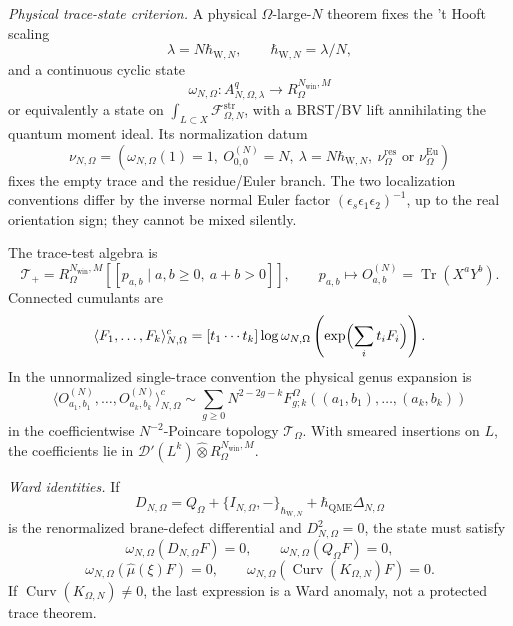 \begin{stmt}
  \emph{Physical trace-state criterion.} A physical
  \(\Omega\)-large-\(N\) theorem fixes the 't Hooft scaling
  \[
    \lambda=N\hbar_{\mathrm{W},N},\qquad
    \hbar_{\mathrm{W},N}=\lambda/N,
  \]
  and a continuous cyclic state
  \[
    \omega_{N,\Omega}\colon
    A^q_{N,\Omega,\lambda}
    \longrightarrow R_{\Omega}^{N_{\mathrm{win}},M}
  \]
  or equivalently a state on
  \(\int_{L\subset X}\mathcal F^{\mathrm{str}}_{\Omega,N}\), with a
  BRST/BV lift annihilating the quantum moment ideal.  Its normalization
  datum
  \[
    \nu_{N,\Omega}
    =
    (\omega_{N,\Omega}(1)=1,\ O^{(N)}_{0,0}=N,\
     \lambda=N\hbar_{\mathrm{W},N},\
     \nu_\Omega^{\mathrm{res}}
     \text{ or }\nu_\Omega^{\mathrm{Eu}})
  \]
  fixes the empty trace and the residue/Euler branch.  The two
  localization conventions differ by the inverse normal Euler factor
  \((\epsilon_s\epsilon_1\epsilon_2)^{-1}\), up to the real orientation
  sign; they cannot be mixed silently.

  The trace-test algebra is
  \[
    \mathscr T_+
    =
    R_{\Omega}^{N_{\mathrm{win}},M}
    [[p_{a,b}\mid a,b\ge0,\ a+b>0]],
    \qquad
    p_{a,b}\mapsto
    O^{(N)}_{a,b}=\operatorname{Tr}(X^aY^b).
  \]
  Connected cumulants are
  \[
    \langle F_1,\ldots,F_k\rangle^c_{N,\Omega}
    =
    [t_1\cdots t_k]\log
    \omega_{N,\Omega}
    \left(\exp\Bigl(\sum_i t_iF_i\Bigr)\right).
  \]
  In the unnormalized single-trace convention the physical genus
  expansion is
  \[
    \langle O^{(N)}_{a_1,b_1},\ldots,O^{(N)}_{a_k,b_k}
    \rangle^c_{N,\Omega}
    \sim
    \sum_{g\ge0}N^{2-2g-k}
    F^\Omega_{g;k}((a_1,b_1),\ldots,(a_k,b_k))
  \]
  in the coefficientwise \(N^{-2}\)-Poincare topology
  \(\mathcal T_\Omega\).  With smeared insertions on \(L\), the
  coefficients lie in
  \(\mathcal D'(L^k)\widehat\otimes
  R_{\Omega}^{N_{\mathrm{win}},M}\).

  \emph{Ward identities.} If
  \[
    D_{N,\Omega}
    =
    Q_\Omega+\{I_{N,\Omega},-\}_{\hbar_{\mathrm{W},N}}
    +\hbar_{\mathrm{QME}}\Delta_{N,\Omega}
  \]
  is the renormalized brane-defect differential and
  \(D_{N,\Omega}^2=0\), the state must satisfy
  \[
    \omega_{N,\Omega}(D_{N,\Omega}F)=0,\qquad
    \omega_{N,\Omega}(Q_\Omega F)=0,
  \]
  \[
    \omega_{N,\Omega}(\widehat\mu(\xi)F)=0,\qquad
    \omega_{N,\Omega}(\operatorname{Curv}(K_{\Omega,N})F)=0.
  \]
  If \(\operatorname{Curv}(K_{\Omega,N})\ne0\), the last expression is a
  Ward anomaly, not a protected trace theorem.


\end{stmt}
